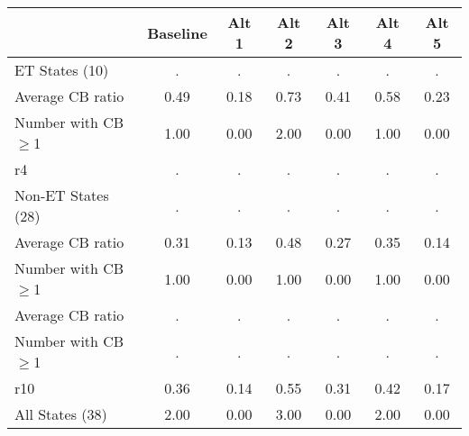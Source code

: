 \begin{table}[htbp]
\begin{tabular}{|l|c|c|c|c|c|c|}\hline  
 & Baseline  & Alt 1  & Alt 2  & Alt 3  & Alt 4  & Alt 5  \\ \hline  
ET States (10) &   . &   . &   . &   . &   . &   . \\ \hline 
Average CB ratio & 0.49 & 0.18 & 0.73 & 0.41 & 0.58 & 0.23 \\ \hline 
Number with CB$\geq$1 & 1.00 & 0.00 & 2.00 & 0.00 & 1.00 & 0.00 \\ \hline 
r4 &   . &   . &   . &   . &   . &   . \\ \hline 
Non-ET States (28) &   . &   . &   . &   . &   . &   . \\ \hline 
Average CB ratio & 0.31 & 0.13 & 0.48 & 0.27 & 0.35 & 0.14 \\ \hline 
Number with CB$\geq$1 & 1.00 & 0.00 & 1.00 & 0.00 & 1.00 & 0.00 \\ \hline 
Average CB ratio &   . &   . &   . &   . &   . &   . \\ \hline 
Number with CB$\geq$1 &   . &   . &   . &   . &   . &   . \\ \hline 
r10 & 0.36 & 0.14 & 0.55 & 0.31 & 0.42 & 0.17 \\ \hline 
All States (38) & 2.00 & 0.00 & 3.00 & 0.00 & 2.00 & 0.00 \\ \hline 
  \end{tabular}
\end{table}
